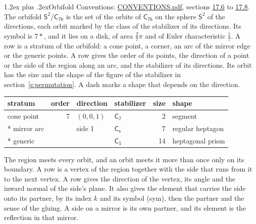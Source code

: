 \documentclass[10pt,a4paper]{article}
\makeatletter
\renewcommand\section{\@startsection{section}{1}{\z@}{-3ex plus -1ex minus -.2ex}%
  {1.2ex plus .2ex}{\normalfont\large\sffamily\bfseries\color{parttitle}}}
\numberwithin{equation}{section}
\newcommand{\grp}[1]{\mathsf{#1}}
\newcommand{\orbname}[1]{#1}
\newcommand{\dirvec}[3]{(#1, #2, #3)}
\newcommand{\twosphere}{\mathsf{S}^{2}}
\makeatother
\begin{document}
\section{Orbifold}\label{s:orbifold}
Conventions: \href{../../CONVENTIONS.pdf}{CONVENTIONS.pdf}, sections \href{../../CONVENTIONS.pdf\#conv.17.6}{17.6} to \href{../../CONVENTIONS.pdf\#conv.17.8}{17.8}.
The orbifold $\twosphere/\grp{C_{7h}}$ is the set of the orbits of $\grp{C_{7h}}$ on the sphere $\twosphere$ of the directions, each orbit marked by the class of the stabilizer of its directions. Its symbol is $\orbname{7{\ast}}$, and it lies on a disk, of area $\tfrac{2}{7}\pi$ and of Euler characteristic $\tfrac{1}{7}$.
\leavevmode\label{n:head.stratum}\label{n:head.order.point}\label{n:head.direction}\label{n:head.stabilizer}\label{n:head.size.orbit}\label{n:head.shape}A row is a stratum of the orbifold: a cone point, a corner, an arc of the mirror edge or the generic points. A row gives the order of its points, the direction of a point or the side of the region along an arc, and the stabilizer of its directions. Its orbit has the size and the shape of the figure of the stabilizer in section~\ref{s:permutation}. A dash marks a shape that depends on the direction.
{\small\setlength{\tabcolsep}{4pt}\begin{longtable}{@{}lrllrl@{}}\toprule
stratum & order & direction & stabilizer & size & shape\\\midrule\endhead
\bottomrule\endfoot\endlastfoot
cone point & 7 & $\dirvec{0}{0}{1}$ & \href{C7.pdf}{$\grp{C_{7}}$} & 2 & segment\\*
mirror arc &  & side 1 & \href{C1v.pdf}{$\grp{C_{s}}$} & 7 & regular heptagon\\*
generic &  &  & \href{C1.pdf}{$\grp{C_{1}}$} & 14 & heptagonal prism\\
\bottomrule\end{longtable}}
\leavevmode\label{n:head.vertex.region}\label{n:head.angle}\label{n:head.normal.side}\label{n:head.partner}\label{n:head.sense}The region meets every orbit, and an orbit meets it more than once only on its boundary. A row is a vertex of the region together with the side that runs from it to the next vertex. A row gives the direction of the vertex, its angle and the inward normal of the side's plane. It also gives the element that carries the side onto its partner, by its index $k$ and its symbol (sym), then the partner and the sense of the gluing. A side on a mirror is its own partner, and its element is the reflection in that mirror.
\end{document}
